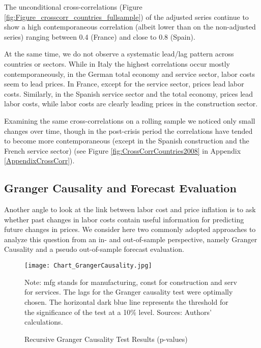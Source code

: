 \documentclass[11pt]{article}
\begin{document}
The unconditional cross-correlations (Figure \ref{fig:Figure_crosscorr_countries_fullsample}) of the adjusted series continue to show a high contemporaneous correlation (albeit lower than on the non-adjusted series) ranging between 0.4 (France) and close to 0.8 (Spain). 

At the same time, we do not observe a systematic lead/lag pattern across countries or sectors. While in Italy the highest correlations occur mostly contemporaneously, in the German total economy and service sector, labor costs seem to lead prices. In France, except for the service sector, prices lead labor costs. Similarly, in the Spanish service sector and the total economy, prices lead labor costs, while labor costs are clearly leading prices in the construction sector.

Examining the same cross-correlations on a rolling sample we noticed only small changes over time, though in the post-crisis period the correlations have tended to become more contemporaneous (except in the Spanish construction and the French service sector) (see Figure \ref{fig:CrossCorrCountries2008} in Appendix \ref{AppendixCrossCorr}).


\subsection{Granger Causality and Forecast Evaluation}
Another angle to look at the link between labor cost and price inflation is to ask whether past changes in labor costs contain useful information for predicting future changes in prices. We consider here two commonly adopted approaches to analyze this question from an in- and out-of-sample perspective, namely Granger Causality and a pseudo out-of-sample forecast evaluation.

\begin{figure} [!htbp]
\begin{center}
\caption{Recursive Granger Causality Test Results (p-values)}\label{fig:Figure_GrangerCausality}
\texttt{[image: Chart\_GrangerCausality.jpg]}
\begin{minipage}{\textwidth} {\footnotesize
Note: mfg stands for manufacturing, const for construction and serv for services. The lags for the Granger causality test were optimally chosen. The horizontal dark blue line represents the threshold for the significance of the test at a 10\% level.
Sources: Authors' calculations.\par}
\end{minipage}
\end{center}
\end{figure}
\end{document}
